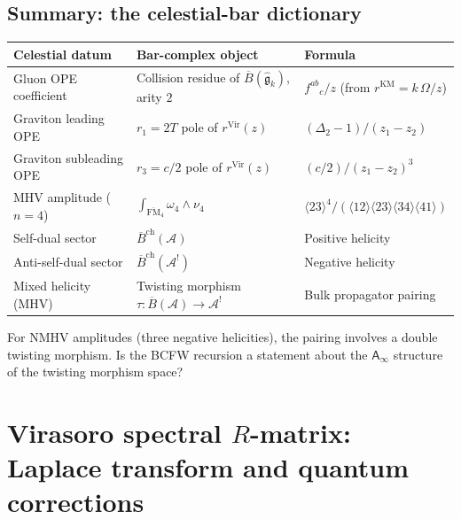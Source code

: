 \documentclass[11pt]{article}
\newcommand{\cA}{\mathcal{A}}
\newcommand{\fg}{\mathfrak{g}}
\newcommand{\barB}{\overline{B}}
\newcommand{\Ainf}{\mathsf{A}_{\infty}}
\begin{document}
\subsection{Summary: the celestial-bar dictionary}
\label{subsec:celestial-bar-dictionary-cel}

\medskip
\begin{center}
\small
\renewcommand{\arraystretch}{1.4}
\begin{tabular}{p{3.5cm}p{3.5cm}p{4.5cm}}
\textbf{Celestial datum} &
\textbf{Bar-complex object} &
\textbf{Formula} \\
\hline
Gluon OPE coefficient &
Collision residue of
  $\barB(\widehat{\fg}_k)$, arity $2$ &
$f^{ab}{}_c / z$
  (from $r^{\mathrm{KM}} = k\,\Omega/z$) \\[4pt]
Graviton leading OPE &
$r_1 = 2T$ pole of
  $r^{\mathrm{Vir}}(z)$ &
$(\Delta_2 - 1) / (z_1 - z_2)$ \\[4pt]
Graviton subleading OPE &
$r_3 = c/2$ pole of
  $r^{\mathrm{Vir}}(z)$ &
$(c/2) / (z_1 - z_2)^3$ \\[4pt]
MHV amplitude ($n = 4$) &
$\int_{\overline{\mathrm{FM}}_4}
  \omega_4 \wedge \nu_4$ &
$\langle 23\rangle^4 / (\langle 12\rangle
  \langle 23\rangle \langle 34\rangle
  \langle 41\rangle)$ \\[4pt]
Self-dual sector &
$\barB^{\mathrm{ch}}(\cA)$ &
Positive helicity \\[4pt]
Anti-self-dual sector &
$\barB^{\mathrm{ch}}(\cA^!)$ &
Negative helicity \\[4pt]
Mixed helicity (MHV) &
Twisting morphism
  $\tau: \barB(\cA) \to \cA^!$ &
Bulk propagator pairing
\end{tabular}
\end{center}

\begin{question}
\label{q:higher-mhv-cel}
For NMHV amplitudes (three negative helicities), the pairing involves a
double twisting morphism.  Is the BCFW recursion a statement about
the $\Ainf$ structure of the twisting morphism space?
\end{question}


\section{Virasoro spectral $R$-matrix: Laplace transform and quantum corrections}
\label{sec:virasoro-spectral-R}
\end{document}

